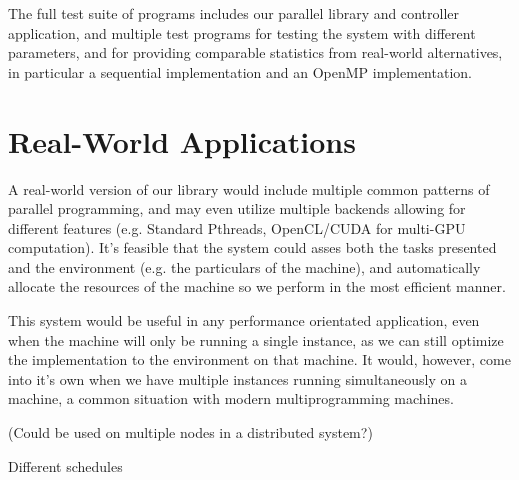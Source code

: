 The full test suite of programs includes our parallel library and controller application, and multiple test programs for testing the system with different parameters, and for providing comparable statistics from real-world alternatives, in particular a sequential implementation and an OpenMP implementation.

\section{Real-World Applications}

A real-world version of our library would include multiple common patterns of parallel programming, and may even utilize multiple backends allowing for different features (e.g. Standard Pthreads, OpenCL/CUDA for multi-GPU computation). It's feasible that the system could asses both the tasks presented and the environment (e.g. the particulars of the machine), and automatically allocate the resources of the machine so we perform in the most efficient manner.

This system would be useful in any performance orientated application, even when the machine will only be running a single instance, as we can still optimize the implementation to the environment on that machine. It would, however, come into it's own when we have multiple instances running simultaneously on a machine, a common situation with modern multiprogramming machines.

(Could be used on multiple nodes in a distributed system?)

Different schedules